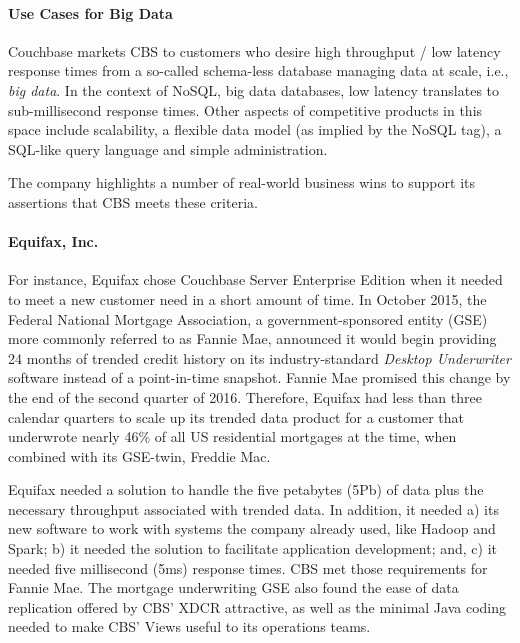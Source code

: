 \documentclass[9pt,twocolumn,twoside]{styles/osajnl}
\begin{document}
\paragraph{Use Cases for Big Data} Couchbase markets CBS to customers who
desire high throughput / low latency response times from a so-called schema-less
database managing data at scale, i.e., \textit{big data}. In the context of
NoSQL, big data databases, low latency translates to sub-millisecond response
times.  Other aspects of competitive products in this space include scalability,
a flexible data model (as implied by the NoSQL tag), a SQL-like query language
and simple administration.\cite{www-cbsintro-cbsinc}

The company highlights a number of real-world business wins to support its
assertions that CBS meets these criteria.

\paragraph{Equifax, Inc.}
For instance, Equifax chose Couchbase
Server Enterprise Edition when it needed to meet a new customer need in a short
amount of time.  In October 2015, the Federal National Mortgage Association, a
government-sponsored entity (GSE) more commonly referred to as Fannie Mae,
announced it would begin providing 24 months of trended credit history on its
industry-standard \textit{Desktop Underwriter} software instead of a point-in-time snapshot.  Fannie Mae promised this change by the end of the second quarter of 2016.  Therefore, Equifax had less than three calendar quarters to scale up its trended data product for a customer that underwrote nearly 46\% of all US residential mortgages at the time, when combined with its GSE-twin, Freddie Mac.
\cite{www-trendeddata-equifax,www-gsemktshare-valuewalk}

Equifax needed a solution to handle the five petabytes (5Pb) of data plus the
necessary throughput associated with trended data.  In addition, it needed a)
its new software to work with systems the company already used, like Hadoop and
Spark; b) it needed the solution to facilitate application development; and, c)
it needed five millisecond (5ms) response times.  CBS met those requirements for
Fannie Mae.  The mortgage underwriting GSE also found the ease of data
replication offered by CBS' XDCR attractive, as well as the minimal Java coding
needed to make CBS' Views useful to its operations teams.
\cite{www-fanniemae-equifax-couchbaseconnect}
\end{document}
